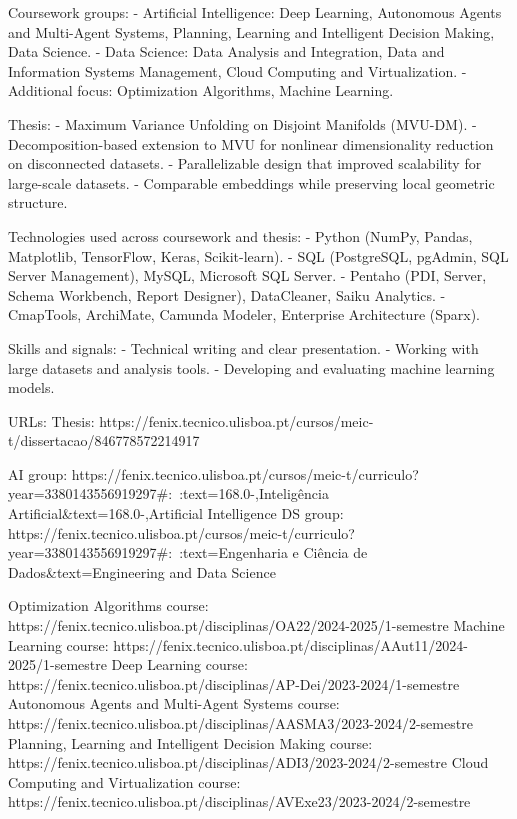 \begin{cventries}
{      Coursework groups:
      - Artificial Intelligence: Deep Learning, Autonomous Agents and Multi-Agent Systems, Planning, Learning and Intelligent Decision Making, Data Science.
      - Data Science: Data Analysis and Integration, Data and Information Systems Management, Cloud Computing and Virtualization.
      - Additional focus: Optimization Algorithms, Machine Learning.

      Thesis:
      - Maximum Variance Unfolding on Disjoint Manifolds (MVU-DM).
      - Decomposition-based extension to MVU for nonlinear dimensionality reduction on disconnected datasets.
      - Parallelizable design that improved scalability for large-scale datasets.
      - Comparable embeddings while preserving local geometric structure.

      Technologies used across coursework and thesis:
      - Python (NumPy, Pandas, Matplotlib, TensorFlow, Keras, Scikit-learn).
      - SQL (PostgreSQL, pgAdmin, SQL Server Management), MySQL, Microsoft SQL Server.
      - Pentaho (PDI, Server, Schema Workbench, Report Designer), DataCleaner, Saiku Analytics.
      - CmapTools, ArchiMate, Camunda Modeler, Enterprise Architecture (Sparx).

      Skills and signals:
      - Technical writing and clear presentation.
      - Working with large datasets and analysis tools.
      - Developing and evaluating machine learning models.

      URLs:
      Thesis: https://fenix.tecnico.ulisboa.pt/cursos/meic-t/dissertacao/846778572214917

      AI group: https://fenix.tecnico.ulisboa.pt/cursos/meic-t/curriculo?year=3380143556919297\#:~:text=168.0-,Inteligência Artificial\&text=168.0-,Artificial Intelligence
      DS group: https://fenix.tecnico.ulisboa.pt/cursos/meic-t/curriculo?year=3380143556919297\#:~:text=Engenharia e Ciência de Dados\&text=Engineering and Data Science

      Optimization Algorithms course: https://fenix.tecnico.ulisboa.pt/disciplinas/OA22/2024-2025/1-semestre
      Machine Learning course: https://fenix.tecnico.ulisboa.pt/disciplinas/AAut11/2024-2025/1-semestre
      Deep Learning course: https://fenix.tecnico.ulisboa.pt/disciplinas/AP-Dei/2023-2024/1-semestre
      Autonomous Agents and Multi-Agent Systems course: https://fenix.tecnico.ulisboa.pt/disciplinas/AASMA3/2023-2024/2-semestre
      Planning, Learning and Intelligent Decision Making course: https://fenix.tecnico.ulisboa.pt/disciplinas/ADI3/2023-2024/2-semestre
      Cloud Computing and Virtualization course: https://fenix.tecnico.ulisboa.pt/disciplinas/AVExe23/2023-2024/2-semestre

}
\end{cventries}
